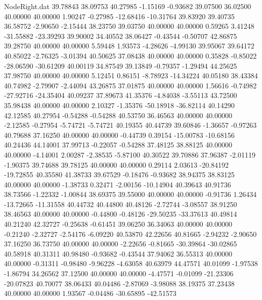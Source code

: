 \begin{filecontents}{NodeRight.dat}
  39.78843   38.09753   40.27985    -1.15169   -0.93682   39.07500   36.02500   40.00000   40.00000    1.90247   -0.27985  -12.68416  -10.31764
  39.83920   39.40735   36.58752    -2.90650   -2.15444   38.23750   39.03750   40.00000   40.00000    0.59265    3.41248  -31.55882  -23.39293
  39.90002   34.40552   38.06427    -0.43544   -0.50707   42.86875   39.28750   40.00000   40.00000    5.59448    1.93573   -4.28626   -4.99130
  39.95067   39.64172   40.85022    -2.76325   -3.01394   40.50625   37.08438   40.00000   40.00000    0.35828   -0.85022  -28.06590  -30.61209
  40.00119   34.87549   39.13849    -0.79357   -1.29494   44.25625   37.98750   40.00000   40.00000    5.12451    0.86151   -8.78923  -14.34224
  40.05180   38.43384   40.74982    -2.79907   -2.44094   43.26875   37.01875   40.00000   40.00000    1.56616   -0.74982  -27.92716  -24.35404
  40.09237   37.89673   41.35376    -4.84038   -3.55113   43.72500   35.98438   40.00000   40.00000    2.10327   -1.35376  -50.18918  -36.82114
  40.14290   42.12585   40.27954    -0.54288   -0.54288   40.53750   36.46563   40.00000   40.00000   -2.12585   -0.27954   -5.74721   -5.74721
  40.19355   40.44739   39.60846    -1.36657   -0.97263   40.79688   37.16250   40.00000   40.00000   -0.44739    0.39154  -15.00783  -10.68156
  40.24436   44.14001   37.99713    -0.22057   -0.54288   37.48125   38.88125   40.00000   40.00000   -4.14001    2.00287   -2.38535   -5.87100
  40.30522   39.70886   37.96387    -2.01119   -1.90375   39.74688   39.78125   40.00000   40.00000    0.29114    2.03613  -20.84192  -19.72855
  40.35580   41.38733   39.67529    -0.18476   -0.93682   38.94375   38.83125   40.00000   40.00000   -1.38733    0.32471   -2.00156  -10.14904
  40.39643   40.91736   38.73566    -1.22332   -1.00844   38.69375   39.55000   40.00000   40.00000   -0.91736    1.26434  -13.72665  -11.31558
  40.44732   40.44800   40.48126    -2.72744   -3.08557   38.91250   38.46563   40.00000   40.00000   -0.44800   -0.48126  -29.50235  -33.37613
  40.49814   40.21240   42.32727    -0.25638   -0.61451   39.06250   36.34063   40.00000   40.00000   -0.21240   -2.32727   -2.54176   -6.09220
  40.53870   42.22656   40.81665    -2.94232   -2.90650   37.16250   36.73750   40.00000   40.00000   -2.22656   -0.81665  -30.39864  -30.02865
  40.58918   40.31311   40.98480    -0.93682   -0.43544   37.94062   36.55313   40.00000   40.00000   -0.31311   -0.98480   -9.96228   -4.63058
  40.63979   44.47571   40.01099    -1.97538   -1.86794   34.26562   37.12500   40.00000   40.00000   -4.47571   -0.01099  -21.23306  -20.07823
  40.70077   38.06433   40.04486    -2.87069   -3.98088   38.19375   37.23438   40.00000   40.00000    1.93567   -0.04486  -30.65895  -42.51573

\end{filecontents}

